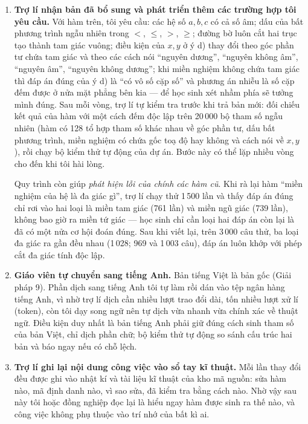 \begin{enumerate}[label=\textbf{Bước \arabic*.}, leftmargin=*, itemsep=6pt]
  \item \textbf{Trợ lí nhận bản đã bổ sung và phát triển thêm các trường hợp tôi
  yêu cầu.} Với hàm trên, tôi yêu cầu: các hệ số $a, b, c$ có cả số âm; dấu của
  bất phương trình ngẫu nhiên trong $<$, $\le$, $>$, $\ge$; đường bờ luôn cắt
  hai trục tạo thành tam giác vuông; điều kiện của $x, y$ ở ý d) thay đổi theo
  góc phần tư chứa tam giác và theo các cách nói ``nguyên dương'', ``nguyên không
  âm'', ``nguyên âm'', ``nguyên không dương''; khi miền nghiệm không chứa tam
  giác thì đáp án đúng của ý d) là ``có vô số cặp số'' và phương án nhiễu là số
  cặp đếm được ở nửa mặt phẳng bên kia --- để học sinh xét nhầm phía sẽ tưởng
  mình đúng. Sau mỗi vòng, trợ lí tự kiểm tra trước khi trả bản mới: đối chiếu
  kết quả của hàm với một cách đếm độc lập trên 20\,000 bộ tham số ngẫu nhiên
  (hàm có 128 tổ hợp tham số khác nhau về góc phần tư, dấu bất phương trình,
  miền nghiệm có chứa gốc toạ độ hay không và cách nói về $x, y$), rồi chạy bộ
  kiểm thử tự động của dự án. Bước này có thể lặp nhiều vòng cho đến khi tôi
  hài lòng.

  Quy trình còn giúp \textit{phát hiện lỗi của chính các hàm cũ}. Khi rà lại
  hàm ``miền nghiệm của hệ là đa giác gì'', trợ lí chạy thử 1\,500 lần và thấy
  đáp án đúng chỉ rơi vào hai loại là miền tam giác (761 lần) và miền ngũ giác
  (739 lần), không bao giờ ra miền tứ giác --- học sinh chỉ cần loại hai đáp án
  còn lại là đã có một nửa cơ hội đoán đúng. Sau khi viết lại, trên 3\,000 câu
  thử, ba loại đa giác ra gần đều nhau (1\,028; 969 và 1\,003 câu), đáp án luôn
  khớp với phép cắt đa giác tính độc lập.

  \item \textbf{Giáo viên tự chuyển sang tiếng Anh.} Bản tiếng Việt là bản gốc
  (Giải pháp 9). Phần dịch sang tiếng Anh tôi tự làm rồi dán vào tệp ngân hàng
  tiếng Anh, vì nhờ trợ lí dịch cần nhiều lượt trao đổi dài, tốn nhiều lượt xử
  lí (token), còn tôi dạy song ngữ nên tự dịch vừa nhanh vừa chính xác về thuật
  ngữ. Điều kiện duy nhất là bản tiếng Anh phải giữ đúng cách sinh tham số của
  bản Việt, chỉ dịch phần chữ; bộ kiểm thử tự động so sánh cấu trúc hai bản và
  báo ngay nếu có chỗ lệch.

  \item \textbf{Trợ lí ghi lại nội dung công việc vào sổ tay kĩ thuật.} Mỗi lần
  thay đổi đều được ghi vào nhật kí và tài liệu kĩ thuật của kho mã nguồn: sửa
  hàm nào, mã định danh nào, vì sao sửa, đã kiểm tra bằng cách nào. Nhờ vậy
  sau này tôi hoặc đồng nghiệp đọc lại là hiểu ngay hàm được sinh ra thế nào, và
  công việc không phụ thuộc vào trí nhớ của bất kì ai.
\end{enumerate}

